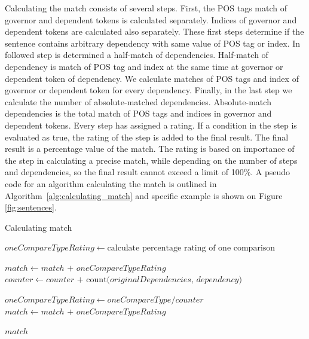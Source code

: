 \documentclass{iitsrc}
\begin{document}
		Calculating the match consists of several steps. First, the POS tags match of governor and dependent tokens is calculated separately. Indices of governor and dependent tokens are calculated also separately. These first steps determine if the sentence contains arbitrary dependency with same value of POS tag or index. In followed step is determined a half-match of dependencies. Half-match of dependency is match of POS tag and index at the same time at governor or dependent token of dependency. We calculate matches of POS tags and index of governor or dependent token for every dependency. Finally, in the last step we calculate the number of absolute-matched dependencies. Absolute-match dependencies is the total match of POS tags and indices in governor and dependent tokens. Every step has assigned a rating. If a condition in the step is evaluated as true, the rating of the step is added to the final result. The final result is a percentage value of the match. The rating is based on importance of the step in calculating a precise match, while depending on the number of steps and dependencies, so the final result cannot exceed a limit of 100\%. A pseudo code for an algorithm calculating the match is outlined in Algorithm~\ref{alg:calculating_match} and specific example is shown on Figure \ref{fig:sentences}.  \\
			
		\begin{algorithm}
			\caption{Calculating match}\label{alg:calculating_match}
			\begin{algorithmic}[1]
				\State $oneCompareTypeRating \gets \text{calculate percentage rating of one comparison}$
				
						\State $match \gets match \text{ + } oneCompareTypeRating$
					\EndIf
					\State $counter \gets counter \text{ + } \text{count(}originalDependencies\text{, } dependency\text{)}$
				\EndFor
				
				\State $oneCompareTypeRating \gets oneCompareType / counter$
								\State $match \gets match \text{ + } oneCompareTypeRating$
							\EndIf
						\EndFor
					\EndFor
				\EndFor
				
				\Return $match$
				\EndProcedure
			\end{algorithmic}
		\end{algorithm}
	
\end{document}
